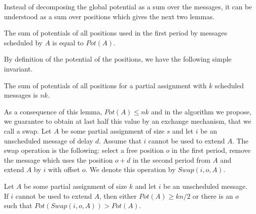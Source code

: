 \documentclass[a4paper,UKenglish,cleveref, autoref, thm-restate]{lipics-v2019}
\begin{document}
Instead of decomposing the global potential as a sum over the messages, it can be understood
as a sum over positions which gives the next two lemmas.

\begin{lemma}\label{lemma:pot_pos}
The sum of potentials of all positions used in the first period by messages scheduled by $A$ is equal to $Pot(A)$.  
\end{lemma}

By definition of the potential of the positions, we have the following simple invariant.

\begin{lemma}\label{lemma:inv}
The sum of potentials of all positions for a partial assignment with $k$ scheduled messages is $nk$.  
\end{lemma}

 As a consequence of this lemma, $Pot(A) \leq nk$ and in the algorithm we 
 propose, we guarantee to obtain at last half this value by an exchange mechanism, that we call a swap.
Let $A$ be some partial assignment of size $s$ and let $i$ be an unscheduled message of delay $d$. 
Assume that $i$ cannot be used to extend $A$. The swap operation is the following: 
select a free position $o$ in the first period, remove the message which uses the position $o+d$ in the second period from $A$ and extend $A$ by $i$ with offset $o$. We denote this operation by $Swap(i,o,A)$.

\begin{lemma}\label{lemma:swap}
Let $A$ be some partial assignment of size $k$ and let $i$ be an unscheduled message. If $i$ cannot be used to extend $A$, then either $Pot(A) \geq kn/2$ or there is an $o$ such that $Pot(Swap(i,o,A)) > Pot(A)$.
\end{lemma}
\end{document}
